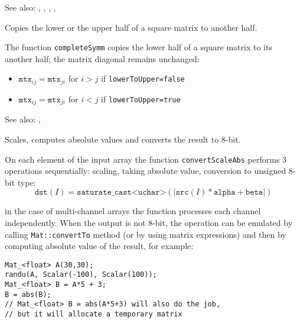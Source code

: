 See also: , , , , 

Copies the lower or the upper half of a square matrix to another half.

\begin{description}
\end{description}

The function \texttt{completeSymm} copies the lower half of a square matrix to its another half; the matrix diagonal remains unchanged:

\begin{itemize}
    \item $\texttt{mtx}_{ij}=\texttt{mtx}_{ji}$ for $i > j$ if \texttt{lowerToUpper=false}
    \item $\texttt{mtx}_{ij}=\texttt{mtx}_{ji}$ for $i < j$ if \texttt{lowerToUpper=true}
\end{itemize}

See also: , 

Scales, computes absolute values and converts the result to 8-bit.

\begin{description}
\end{description}

On each element of the input array the function \texttt{convertScaleAbs} performs 3 operations sequentially: scaling, taking absolute value, conversion to unsigned 8-bit type:
\[\texttt{dst}(I)=\texttt{saturate\_cast<uchar>}(|\texttt{src}(I)*\texttt{alpha} + \texttt{beta}|)\]

in the case of multi-channel arrays the function processes each channel independently. When the output is not 8-bit, the operation can be emulated by calling \texttt{Mat::convertTo} method (or by using matrix expressions) and then by computing absolute value of the result, for example:

\begin{lstlisting}
Mat_<float> A(30,30);
randu(A, Scalar(-100), Scalar(100));
Mat_<float> B = A*5 + 3;
B = abs(B);
// Mat_<float> B = abs(A*5+3) will also do the job,
// but it will allocate a temporary matrix
\end{lstlisting}

